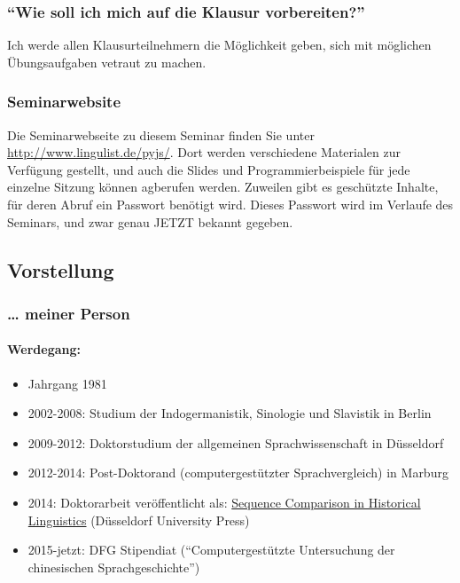 \subsubsection{\texorpdfstring{{``Wie soll ich mich auf die Klausur
vorbereiten?''}}{Wie soll ich mich auf die Klausur vorbereiten?}}

Ich werde allen Klausurteilnehmern die Möglichkeit geben, sich mit
möglichen Übungsaufgaben vetraut zu machen.

\subsubsection{Seminarwebsite}
Die Seminarwebseite zu diesem Seminar finden Sie unter
\href{http://www.lingulist.de/pyjs}{http://www.lingulist.de/pyjs/}. Dort
werden verschiedene Materialen zur Verfügung gestellt, und auch die
Slides und Programmierbeispiele für jede einzelne Sitzung können
agberufen werden. Zuweilen gibt es geschützte Inhalte, für deren Abruf
ein Passwort benötigt wird. Dieses Passwort wird im Verlaufe des
Seminars, und zwar genau {JETZT} bekannt gegeben.

\subsection{\texorpdfstring{{Vorstellung}}{Vorstellung}}

\subsubsection{\texorpdfstring{{\ldots{} meiner
Person}}{\ldots{} meiner Person}}

\paragraph{Werdegang:}

\begin{itemize}
\itemsep1pt\parskip0pt
\item
  Jahrgang 1981
\item
  2002-2008: Studium der Indogermanistik, Sinologie und Slavistik in
  Berlin
\item
  2009-2012: Doktorstudium der allgemeinen Sprachwissenschaft in
  Düsseldorf
\item
  2012-2014: Post-Doktorand (computergestützter Sprachvergleich) in
  Marburg
\item
  2014: Doktorarbeit veröffentlicht als:
  \href{http://sequencecomparison.github.io}{Sequence Comparison in
  Historical Linguistics} (Düsseldorf University Press)
\item
  2015-jetzt: DFG Stipendiat (``Computergestützte Untersuchung der
  chinesischen Sprachgeschichte'')
\end{itemize}




